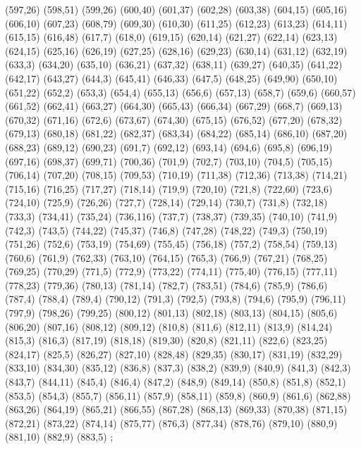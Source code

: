 {(597,26)
(598,51)
(599,26)
(600,40)
(601,37)
(602,28)
(603,38)
(604,15)
(605,16)
(606,10)
(607,23)
(608,79)
(609,30)
(610,30)
(611,25)
(612,23)
(613,23)
(614,11)
(615,15)
(616,48)
(617,7)
(618,0)
(619,15)
(620,14)
(621,27)
(622,14)
(623,13)
(624,15)
(625,16)
(626,19)
(627,25)
(628,16)
(629,23)
(630,14)
(631,12)
(632,19)
(633,3)
(634,20)
(635,10)
(636,21)
(637,32)
(638,11)
(639,27)
(640,35)
(641,22)
(642,17)
(643,27)
(644,3)
(645,41)
(646,33)
(647,5)
(648,25)
(649,90)
(650,10)
(651,22)
(652,2)
(653,3)
(654,4)
(655,13)
(656,6)
(657,13)
(658,7)
(659,6)
(660,57)
(661,52)
(662,41)
(663,27)
(664,30)
(665,43)
(666,34)
(667,29)
(668,7)
(669,13)
(670,32)
(671,16)
(672,6)
(673,67)
(674,30)
(675,15)
(676,52)
(677,20)
(678,32)
(679,13)
(680,18)
(681,22)
(682,37)
(683,34)
(684,22)
(685,14)
(686,10)
(687,20)
(688,23)
(689,12)
(690,23)
(691,7)
(692,12)
(693,14)
(694,6)
(695,8)
(696,19)
(697,16)
(698,37)
(699,71)
(700,36)
(701,9)
(702,7)
(703,10)
(704,5)
(705,15)
(706,14)
(707,20)
(708,15)
(709,53)
(710,19)
(711,38)
(712,36)
(713,38)
(714,21)
(715,16)
(716,25)
(717,27)
(718,14)
(719,9)
(720,10)
(721,8)
(722,60)
(723,6)
(724,10)
(725,9)
(726,26)
(727,7)
(728,14)
(729,14)
(730,7)
(731,8)
(732,18)
(733,3)
(734,41)
(735,24)
(736,116)
(737,7)
(738,37)
(739,35)
(740,10)
(741,9)
(742,3)
(743,5)
(744,22)
(745,37)
(746,8)
(747,28)
(748,22)
(749,3)
(750,19)
(751,26)
(752,6)
(753,19)
(754,69)
(755,45)
(756,18)
(757,2)
(758,54)
(759,13)
(760,6)
(761,9)
(762,33)
(763,10)
(764,15)
(765,3)
(766,9)
(767,21)
(768,25)
(769,25)
(770,29)
(771,5)
(772,9)
(773,22)
(774,11)
(775,40)
(776,15)
(777,11)
(778,23)
(779,36)
(780,13)
(781,14)
(782,7)
(783,51)
(784,6)
(785,9)
(786,6)
(787,4)
(788,4)
(789,4)
(790,12)
(791,3)
(792,5)
(793,8)
(794,6)
(795,9)
(796,11)
(797,9)
(798,26)
(799,25)
(800,12)
(801,13)
(802,18)
(803,13)
(804,15)
(805,6)
(806,20)
(807,16)
(808,12)
(809,12)
(810,8)
(811,6)
(812,11)
(813,9)
(814,24)
(815,3)
(816,3)
(817,19)
(818,18)
(819,30)
(820,8)
(821,11)
(822,6)
(823,25)
(824,17)
(825,5)
(826,27)
(827,10)
(828,48)
(829,35)
(830,17)
(831,19)
(832,29)
(833,10)
(834,30)
(835,12)
(836,8)
(837,3)
(838,2)
(839,9)
(840,9)
(841,3)
(842,3)
(843,7)
(844,11)
(845,4)
(846,4)
(847,2)
(848,9)
(849,14)
(850,8)
(851,8)
(852,1)
(853,5)
(854,3)
(855,7)
(856,11)
(857,9)
(858,11)
(859,8)
(860,9)
(861,6)
(862,88)
(863,26)
(864,19)
(865,21)
(866,55)
(867,28)
(868,13)
(869,33)
(870,38)
(871,15)
(872,21)
(873,22)
(874,14)
(875,77)
(876,3)
(877,34)
(878,76)
(879,10)
(880,9)
(881,10)
(882,9)
(883,5)
};
